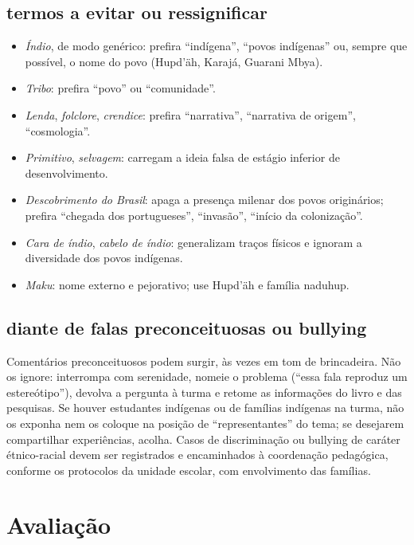 \section{termos a evitar ou ressignificar}

\begin{itemize}
\item \textit{Índio}, de modo genérico: prefira ``indígena'', ``povos
indígenas'' ou, sempre que possível, o nome do povo (Hupd'äh, Karajá,
Guarani Mbya).
\item \textit{Tribo}: prefira ``povo'' ou ``comunidade''.
\item \textit{Lenda}, \textit{folclore}, \textit{crendice}: prefira
``narrativa'', ``narrativa de origem'', ``cosmologia''.
\item \textit{Primitivo}, \textit{selvagem}: carregam a ideia falsa de
estágio inferior de desenvolvimento.
\item \textit{Descobrimento do Brasil}: apaga a presença milenar dos
povos originários; prefira ``chegada dos portugueses'', ``invasão'',
``início da colonização''.
\item \textit{Cara de índio}, \textit{cabelo de índio}: generalizam
traços físicos e ignoram a diversidade dos povos indígenas.
\item \textit{Maku}: nome externo e pejorativo; use Hupd'äh e família
naduhup.
\end{itemize}

\section{diante de falas preconceituosas ou bullying}

Comentários preconceituosos podem surgir, às vezes em tom de brincadeira.
Não os ignore: interrompa com serenidade, nomeie o problema (``essa fala
reproduz um estereótipo''), devolva a pergunta à turma e retome as
informações do livro e das pesquisas. Se houver estudantes indígenas ou
de famílias indígenas na turma, não os exponha nem os coloque na posição
de ``representantes'' do tema; se desejarem compartilhar experiências,
acolha. Casos de discriminação ou bullying de caráter étnico-racial
devem ser registrados e encaminhados à coordenação pedagógica, conforme
os protocolos da unidade escolar, com envolvimento das famílias.

\chapter{Avaliação}

